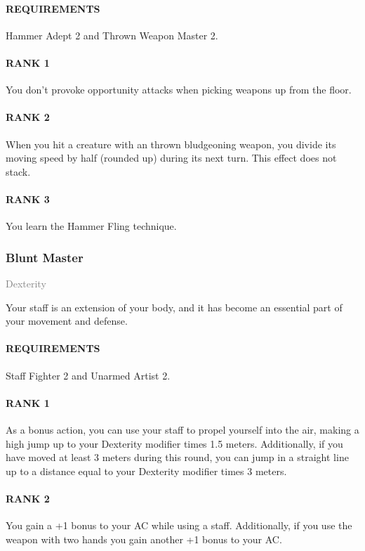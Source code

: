 \paragraph{REQUIREMENTS} Hammer Adept 2 and Thrown Weapon Master 2.
\paragraph{RANK 1} You don't provoke opportunity attacks when picking weapons up from the floor.
\paragraph{RANK 2} When you hit a creature with an thrown bludgeoning weapon, you divide its moving speed by half (rounded up) during its next turn.
This effect does not stack.
\paragraph{RANK 3} You learn the Hammer Fling technique.

\subsubsection{Blunt Master} \label{feat::bluntmaster}
\small{\textcolor{gray}{Dexterity}}

\normalsize
Your staff is an extension of your body, and it has become an essential part of your movement and defense.
\paragraph{REQUIREMENTS} Staff Fighter 2 and Unarmed Artist 2.
\paragraph{RANK 1} As a bonus action, you can use your staff to propel yourself into the air, making a high jump up to your Dexterity modifier times 1.5 meters.
Additionally, if you have moved at least 3 meters during this round, you can jump in a straight line up to a distance equal to your Dexterity modifier times 3 meters.
\paragraph{RANK 2} You gain a +1 bonus to your AC while using a staff.
Additionally, if you use the weapon with two hands you gain another +1 bonus to your AC.
